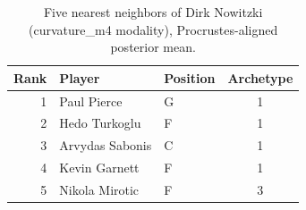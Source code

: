 \begin{table}[htbp]
  \centering\small
  \begin{tabular}{rllc}
    \toprule
    Rank & Player & Position & Archetype \\
    \midrule
    1 & Paul Pierce & G & 1 \\
    2 & Hedo Turkoglu & F & 1 \\
    3 & Arvydas Sabonis & C & 1 \\
    4 & Kevin Garnett & F & 1 \\
    5 & Nikola Mirotic & F & 3 \\
    \bottomrule
  \end{tabular}
  \caption{Five nearest neighbors of Dirk Nowitzki (curvature_m4 modality), Procrustes-aligned posterior mean.}
  \label{tab:Dirk_Nowitzki_neighbors_curvature_m4}
\end{table}

